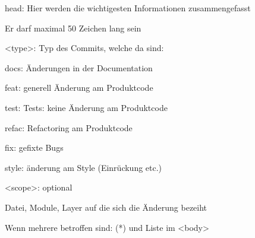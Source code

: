 \documentclass[
   draft=false
  ,paper=a4
  ,twoside=false
  ,fontsize=11pt
  ,headsepline
  ,DIV=11
  ,parskip=full+
  ,titlepage
]{scrartcl} %
\begin{document}
  \begin{compactitem}
    \item[head:]  Hier werden die wichtigesten Informationen zusammengefasst
    \begin{compactitem}
               \item  Er darf maximal 50 Zeichen lang sein
    \end{compactitem}
   
      \begin{compactitem}
         \item[<type>:] Typ des Commits, welche da sind:
            \begin{compactitem}
               \item[docs:]  Änderungen in der Documentation
               \item[feat:]  generell Änderung am Produktcode
               \item[test:]  Tests: keine Änderung am Produktcode
               \item[refac:] Refactoring am Produktcode
               \item[fix:]   gefixte Bugs
               \item[style:] änderung am Style (Einrückung etc.)
            \end{compactitem}
         \item[<scope>:] optional
            \begin{compactitem}
              \item Datei, Module, Layer auf die sich die Änderung
                 bezeiht       
              \item Wenn mehrere betroffen sind: (*) und Liste im <body>
            \end{compactitem} 
              

\end{compactitem}
\end{compactitem}
\end{document}
